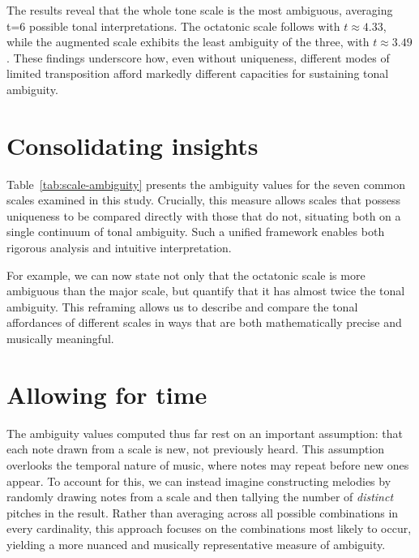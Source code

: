 \documentclass[10pt,twocolumn]{article}
\numberwithin{equation}{section} %
\begin{document}
    The results reveal that the whole tone scale is the most ambiguous, averaging t=6 possible tonal interpretations.
    The octatonic scale follows with $t \approx 4.33$, while the augmented scale exhibits the least ambiguity of the three, with $t \approx 3.49$.
    These findings underscore how, even without uniqueness, different modes of limited transposition afford markedly different capacities for sustaining tonal ambiguity.

    

    \section{Consolidating insights}

    Table~\ref{tab:scale-ambiguity} presents the ambiguity values for the seven common scales examined in this study.
    Crucially, this measure allows scales that possess uniqueness to be compared directly with those that do not, situating both on a single continuum of tonal ambiguity.
    Such a unified framework enables both rigorous analysis and intuitive interpretation.

    For example, we can now state not only that the octatonic scale is more ambiguous than the major scale, but quantify that it has almost twice the tonal ambiguity.
    This reframing allows us to describe and compare the tonal affordances of different
    scales in ways that are both mathematically precise and musically meaningful.

    

    \section{Allowing for time}

    The ambiguity values computed thus far rest on an important assumption: that each note drawn from a scale is new, not previously heard.
    This assumption overlooks the temporal nature of music, where notes may repeat before new ones appear.
    To account for this, we can instead imagine constructing melodies by randomly drawing notes from a scale and then tallying the number of \textit{distinct} pitches in the result.
    Rather than averaging across all possible combinations in every cardinality, this approach focuses on the combinations most likely to occur, yielding a more nuanced and musically representative measure of ambiguity.
\end{document}
